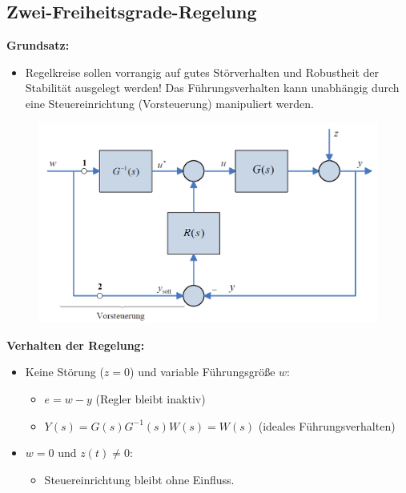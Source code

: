 \documentclass[10pt,a4paper]{article}
\begin{document}
\subsection{Zwei-Freiheitsgrade-Regelung}
\textbf{Grundsatz:}
\begin{itemize}
	\item Regelkreise sollen vorrangig auf gutes Störverhalten und Robustheit der Stabilität ausgelegt werden! Das Führungsverhalten kann unabhängig durch eine Steuereinrichtung (Vorsteuerung) manipuliert werden.
\end{itemize}

\begin{figure}[H]
	\includegraphics[width=0.5\columnwidth]{imgs/abb7_2.png}
\end{figure}

\textbf{Verhalten der Regelung:}
\begin{itemize}
	\item Keine Störung ($z = 0$) und variable Führungsgröße $w$:
	\begin{itemize}
		\item $e = w - y$ (Regler bleibt inaktiv)
		\item $Y(s) = G(s)G^{-1}(s)W(s) = W(s)$ (ideales Führungsverhalten)
	\end{itemize}
	\item $w = 0$ und $z(t) ≠ 0$:
	\begin{itemize}
		\item Steuereinrichtung bleibt ohne Einfluss.
	\end{itemize}
\end{itemize}
\end{document}
